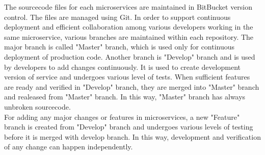 The sourcecode files for each microservices are maintained in BitBucket version control. The files are managed using Git. In order to support continuous deployment and efficient collaboration among various developers working in the same microservice, various branches are maintained within each repository. The major branch is called "Master" branch, which is used only for continuous deployment of production code. Another branch is "Develop" branch and is used by developers to add changes continuously. It is used to create development version of service and undergoes various level of tests. When sufficient features are ready and verified in "Develop" branch, they are merged into "Master" branch and realeased from "Master" branch. In this way, "Master" branch has always unbroken sourcecode.
\\
For adding any major changes or features in microservices, a new "Feature" branch is created from "Develop" branch and undergoes various levels of testing before it is merged with develop branch. In this way, development and verification of any change can happen independently.

